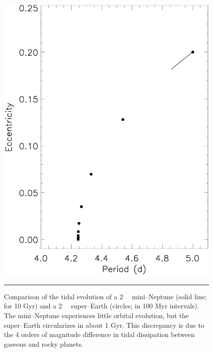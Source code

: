 \begin{figure}[t] 
  \begin{minipage}[c]{0.39\textwidth}
    \includegraphics[width=\textwidth]{figures/compq.ps}
  \end{minipage}\hfill
  \begin{minipage}[c]{0.6\textwidth}
    \caption{Comparison of the tidal evolution of a
  2~\rearth~ mini--Neptune (solid line; for 10 Gyr) and a 2~\rearth~
  super--Earth (circles; in 100 Myr intervals).  The mini--Neptune
  experiences little orbital evolution, but the super--Earth
  circularizes in about 1 Gyr.  This discrepancy is due to the 4
  orders of magnitude difference in tidal dissipation between gaseous
  and rocky planets.}
    \label{fig:compareQ}
    \hspace*{\fill}  
    \hrule
  \end{minipage}
\end{figure}

